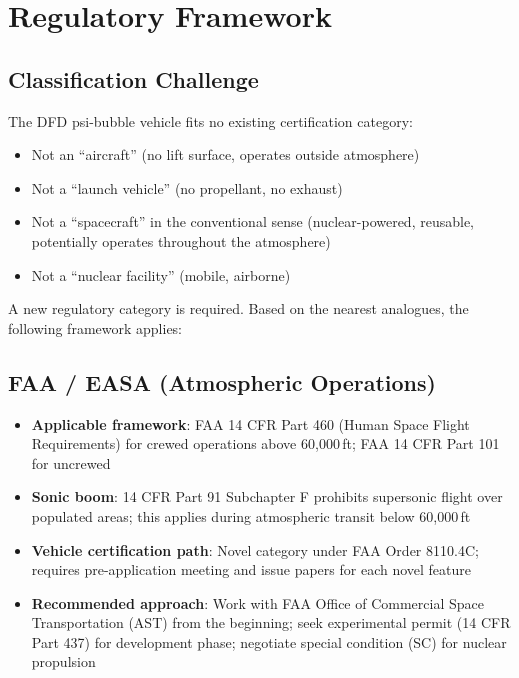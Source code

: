 \documentclass[11pt,a4paper]{article}
\begin{document}
\section{Regulatory Framework}
\label{sec:regulatory}

\subsection{Classification Challenge}

The DFD psi-bubble vehicle fits no existing certification category:
\begin{itemize}
  \item Not an ``aircraft'' (no lift surface, operates outside atmosphere)
  \item Not a ``launch vehicle'' (no propellant, no exhaust)
  \item Not a ``spacecraft'' in the conventional sense (nuclear-powered,
    reusable, potentially operates throughout the atmosphere)
  \item Not a ``nuclear facility'' (mobile, airborne)
\end{itemize}

A new regulatory category is required. Based on the nearest analogues,
the following framework applies:

\subsection{FAA / EASA (Atmospheric Operations)}

\begin{itemize}
  \item \textbf{Applicable framework}: FAA 14 CFR Part 460
    (Human Space Flight Requirements) for crewed operations above
    60,000\,ft; FAA 14 CFR Part 101 for uncrewed
  \item \textbf{Sonic boom}: 14 CFR Part 91 Subchapter F prohibits
    supersonic flight over populated areas; this applies during
    atmospheric transit below 60,000\,ft
  \item \textbf{Vehicle certification path}: Novel category under
    FAA Order 8110.4C; requires pre-application meeting and
    issue papers for each novel feature
  \item \textbf{Recommended approach}: Work with FAA Office of
    Commercial Space Transportation (AST) from the beginning;
    seek experimental permit (14 CFR Part 437) for development
    phase; negotiate special condition (SC) for nuclear propulsion
\end{itemize}
\end{document}
